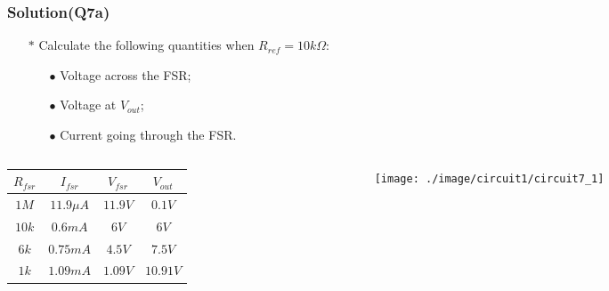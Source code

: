 \documentclass{beamer}
\begin{document}
\begin{frame}
\frametitle{Solution(Q7a)}
\begin{itemize} \itemsep1pt \parskip0pt 
  \item[$\ast$] Calculate the following quantities when $R_{ref} = 10k \Omega$:
  \begin{itemize} \itemsep1pt \parskip0pt 
  \item[$\bullet$] Voltage across the FSR;
  \item[$\bullet$] Voltage at $V_{out}$;
  \item[$\bullet$] Current going through the FSR.
  \end{itemize}
\end{itemize}

\begin{columns}

\begin{column}{6cm}

\begin{table}
\begin{center}
\def\arraystretch{1.5}
\begin{tabular}{|c|c|c|c|}
\hline
$R_{fsr}$ & $I_{fsr}$ & $V_{fsr}$ & $V_{out}$ \\
\hline
$1M$    & $11.9 \mu A$ & $11.9V$ & $0.1V$ \\
\hline
$10k$   & $0.6mA$ & $6V$ & $6V$ \\
\hline
$6k$    & $0.75mA$ & $4.5V$ & $7.5V$ \\
\hline
$1k$    & $1.09mA$ & $1.09V$ & $10.91V$ \\
\hline
\end{tabular}
\end{center}
\end{table}

\end{column}


\begin{column}{6cm}
\begin{figure}[H]
  \centering
  \texttt{[image: ./image/circuit1/circuit7\_1]}
\end{figure}
\end{column}

\end{columns}

\end{frame}

\end{document}

